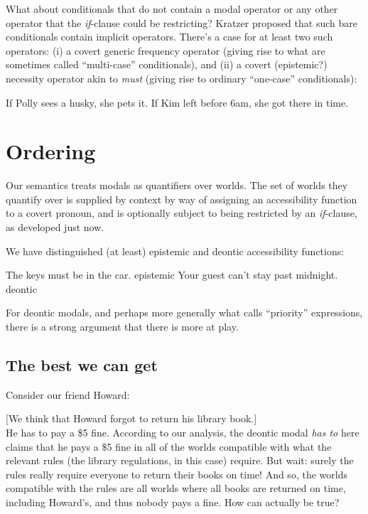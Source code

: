 What about conditionals that do not contain a modal operator or any other
operator that the \emph{if}-clause could be restricting? Kratzer proposed that
such bare conditionals contain implicit operators. %
%
There's a case for at least two such operators: (i) a covert generic frequency
operator (giving rise to what are sometimes called ``multi-case'' conditionals),
and (ii) a covert (epistemic?) necessity operator akin to \emph{must} (giving
rise to ordinary ``one-case'' conditionals):

\pex
\a If Polly sees a husky, she pets it.
\a If Kim left before 6am, she got there in time.
\xe

\section{Ordering}
\label{sec:ordering}

\enlargethispage{36pt}%
Our semantics treats modals as quantifiers over worlds. The set of worlds they
quantify over is supplied by context by way of assigning an accessibility
function to a covert pronoun, and is optionally subject to being restricted by
an \emph{if}-clause, as developed just now.

We have distinguished (at least) epistemic and deontic accessibility functions:

\pex
\a The keys must be in the car.                                \hfill{epistemic}
\a Your guest can't stay past midnight.                          \hfill{deontic}
\xe

For deontic modals, and perhaps more generally what \cite{portner-2018-Mood}
calls ``priority'' expressions, there is a strong argument that there is more at
play.

\subsection{The best we can get}
\label{subsec:best}

Consider our friend Howard:

\ex\label{ex:fine}[We think that Howard forgot to return his library book.]\\
He has to pay a \$5 fine.\xe
%
According to our analysis, the deontic modal \emph{has to} here claims that he
pays a \$5 fine in all of the worlds compatible with what the relevant rules
(the library regulations, in this case) require. But wait: surely the rules
really require everyone to return their books on time! And so, the worlds
compatible with the rules are all worlds where all books are returned on time,
including Howard’s, and thus nobody pays a fine. How can \Last actually be true?

